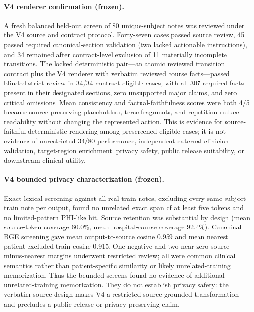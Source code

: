 \documentclass[11pt]{article}
\begin{document}
\paragraph{V4 renderer confirmation (frozen).} A fresh balanced held-out screen of 80 unique-subject notes was reviewed under the V4 source and contract protocol.  Forty-seven cases passed source review, 45 passed required canonical-section validation (two lacked actionable instructions), and 34 remained after contract-level exclusion of 11 materially incomplete transitions.  The locked deterministic pair---an atomic reviewed transition contract plus the V4 renderer with verbatim reviewed course facts---passed blinded strict review in 34/34 contract-eligible cases, with all 307 required facts present in their designated sections, zero unsupported major claims, and zero critical omissions.  Mean consistency and factual-faithfulness scores were both 4/5 because source-preserving placeholders, terse fragments, and repetition reduce readability without changing the represented action.  This is evidence for source-faithful deterministic rendering among prescreened eligible cases; it is not evidence of unrestricted 34/80 performance, independent external-clinician validation, target-region enrichment, privacy safety, public release suitability, or downstream clinical utility.

\paragraph{V4 bounded privacy characterization (frozen).} Exact lexical screening against all real train notes, excluding every same-subject train note per output, found no unrelated exact span of at least five tokens and no limited-pattern PHI-like hit.  Source retention was substantial by design (mean source-token coverage 60.0\%; mean hospital-course coverage 92.4\%).  Canonical BGE screening gave mean output-to-source cosine 0.959 and mean nearest patient-excluded-train cosine 0.915.  One negative and two near-zero source-minus-nearest margins underwent restricted review; all were common clinical semantics rather than patient-specific similarity or likely unrelated-training memorization.  Thus the bounded screens found no evidence of additional unrelated-training memorization.  They do not establish privacy safety: the verbatim-source design makes V4 a restricted source-grounded transformation and precludes a public-release or privacy-preserving claim.
\end{document}
